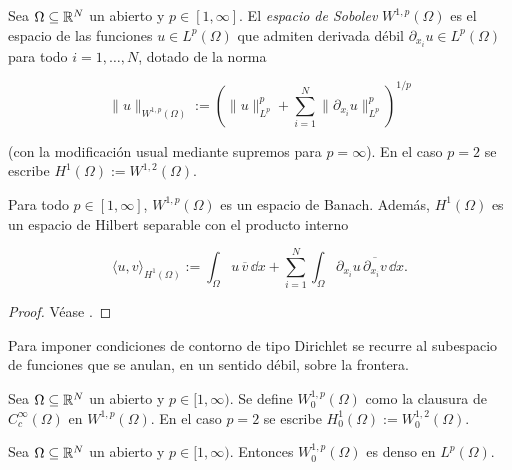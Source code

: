 \begin{Definicion}
\label{ch:preliminares:def:sobolev}

Sea $\Omega \subseteq \mathbb{R}^N$ un abierto y $p \in [1, \infty]$. El \textit{espacio
de Sobolev} $W^{1,p}(\Omega)$ es el espacio de las funciones
$u \in L^p(\Omega)$ que admiten derivada débil
$\partial_{x_i} u \in L^p(\Omega)$ para todo $i = 1, \ldots, N$, dotado de la
norma

\[\lVert u \rVert_{W^{1,p}(\Omega)} := \left( \lVert u \rVert_{L^p}^p + \sum_{i=1}^N \lVert \partial_{x_i} u \rVert_{L^p}^p \right)^{1/p}\]

(con la modificación usual mediante supremos para $p = \infty$). En el caso
$p = 2$ se escribe $H^1(\Omega) := W^{1,2}(\Omega)$.
\end{Definicion}

\begin{Proposicion}
\label{ch:preliminares:prop:H1Hilbert}

Para todo $p \in [1, \infty]$, $W^{1,p}(\Omega)$ es un espacio de Banach. Además,
$H^1(\Omega)$ es un espacio de Hilbert separable con el producto interno

\[\langle u, v \rangle_{H^1(\Omega)} := \int_\Omega u \, \overline{v} \, \dd x + \sum_{i=1}^N \int_\Omega \partial_{x_i} u \, \overline{\partial_{x_i} v} \, \dd x.\]
\end{Proposicion}

\begin{proof}
Véase \cite[Proposición~8.1]{brezis-2011-fun-ana-sob}.
\end{proof}

Para imponer condiciones de contorno de tipo Dirichlet se recurre al subespacio
de funciones que se anulan, en un sentido débil, sobre la frontera.\\

\begin{Definicion}[$H_0^1$ y $W_0^{1,p}$]
\label{ch:preliminares:def:H01}

Sea $\Omega \subseteq \mathbb{R}^N$ un abierto y $p \in [1, \infty)$. Se define
$W_0^{1,p}(\Omega)$ como la clausura de $C_c^\infty(\Omega)$ en
$W^{1,p}(\Omega)$. En el caso $p = 2$ se escribe
$H_0^1(\Omega) := W_0^{1,2}(\Omega)$.
\end{Definicion}

\begin{Lema}[Densidad de $W_0^{1,p}$ en $L^p$]
\label{ch:preliminares:lema:W0denso}

Sea $\Omega \subseteq \mathbb{R}^N$ un abierto y $p \in [1, \infty)$. Entonces
$W_0^{1,p}(\Omega)$ es denso en $L^p(\Omega)$.
\end{Lema}

